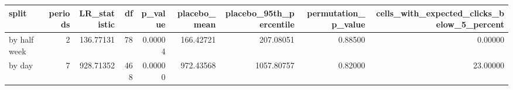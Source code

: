 \begin{tabular}{lrrrrrrrr}
\toprule
split & periods & LR\_statistic & df & p\_value & placebo\_mean & placebo\_95th\_percentile & permutation\_p\_value & cells\_with\_expected\_clicks\_below\_5\_percent \\
\midrule
by half week & 2 & 136.77131 & 78 & 0.00004 & 166.42721 & 207.08051 & 0.88500 & 0.00000 \\
by day & 7 & 928.71352 & 468 & 0.00000 & 972.43568 & 1057.80757 & 0.82000 & 23.00000 \\
\bottomrule
\end{tabular}
